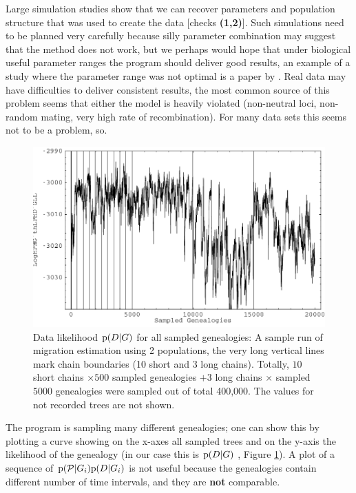 Large simulation studies show that we can recover parameters and 
population structure that was used to create the data
[checks \textbf{ (1,2)}].  Such simulations need to be planned very carefully because silly parameter combination may suggest that the method does not work, but we perhaps would hope that under biological useful parameter ranges the program should deliver good results, an example of a study where the parameter range was not optimal is a paper by \cite{Abdo:2004:EPL}. Real data may have difficulties to deliver consistent results, the most common source of this problem seems that either the model is heavily violated (non-neutral loci, non-random mating, very high rate of recombination). For many data sets this seems not to be a problem, so.
\begin{figure}[htbp]
\begin{center}
\includegraphics[width=12cm]{mim/mixing}
\end{center}
\vskip -0.5cm
\caption{Data likelihood ${\mathrm p}(D|G)$ for all sampled genealogies: 
A sample run of migration estimation using 2 populations,
the very long vertical lines mark chain boundaries (10 short and
3 long chains). Totally, $10$ short chains $\times 500$ sampled genealogies 
$+ 3$ long chains $\times$ sampled $5000$ genealogies were sampled out of
total 400,000. The values for not recorded trees are 
not shown.
}
\label{FIGMIX}
\end{figure}

The program is sampling many different genealogies; one can show 
this by plotting
a curve showing on the x-axes all sampled trees and on the y-axis 
the likelihood of the genealogy (in our case this is ${\mathrm p}(D|G)$
, Figure \ref{FIGMIX}). 
A plot of a sequence of ${\mathrm p}(\mathcal{P}|G_i){\mathrm p}(D|G_i)$ is not 
useful because the genealogies contain different number of time intervals,
and they are \textbf{ not} comparable. 

